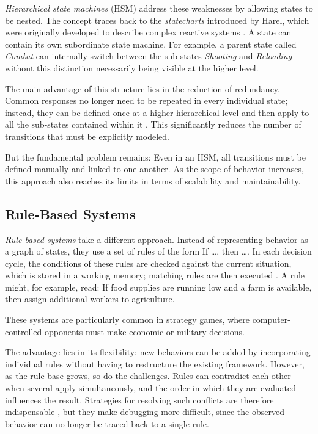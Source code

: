 \emph{Hierarchical state machines} (HSM) address these weaknesses by allowing states to be nested. The concept traces back to the \emph{statecharts} introduced by Harel, which were originally developed to describe complex reactive systems \cite{harel1987}. A state can contain its own subordinate state machine. For example, a parent state called \emph{Combat} can internally switch between the sub-states \emph{Shooting} and \emph{Reloading} without this distinction necessarily being visible at the higher level.

The main advantage of this structure lies in the reduction of redundancy. Common responses no longer need to be repeated in every individual state; instead, they can be defined once at a higher hierarchical level and then apply to all the sub-states contained within it \cite{millington2009}. This significantly reduces the number of transitions that must be explicitly modeled.

But the fundamental problem remains: Even in an HSM, all transitions must be defined manually and linked to one another. As the scope of behavior increases, this approach also reaches its limits in terms of scalability and maintainability.

\subsection{Rule-Based Systems}

\emph{Rule-based systems} take a different approach. Instead of representing behavior as a graph of states, they use a set of rules of the form \glqq If \ldots{}, then \ldots{}\grqq{}. In each decision cycle, the conditions of these rules are checked against the current situation, which is stored in a working memory; matching rules are then executed \cite{russell2021}. A rule might, for example, read: \glqq If food supplies are running low and a farm is available, then assign additional workers to agriculture.\grqq{}

These systems are particularly common in strategy games, where computer-controlled opponents must make economic or military decisions.

The advantage lies in its flexibility: new behaviors can be added by incorporating individual rules without having to restructure the existing framework. However, as the rule base grows, so do the challenges. Rules can contradict each other when several apply simultaneously, and the order in which they are evaluated influences the result. Strategies for resolving such conflicts are therefore indispensable \cite{russell2021}, but they make debugging more difficult, since the observed behavior can no longer be traced back to a single rule.


